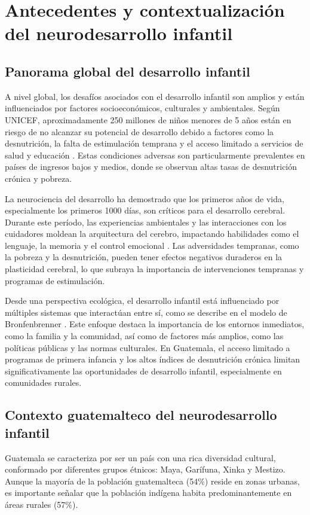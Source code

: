 \documentclass[11pt,letterpaper]{report}
\begin{document}
\section{Antecedentes y contextualización del neurodesarrollo infantil}
\subsection{Panorama global del desarrollo infantil}
A nivel global,  los desafíos asociados con el desarrollo infantil son amplios
y están influenciados por factores socioeconómicos, culturales y ambientales.
Según UNICEF, aproximadamente 250 millones de niños menores de 5 años están en 
riesgo de no alcanzar su potencial de desarrollo debido a factores como la 
desnutrición, la falta de estimulación temprana y el acceso limitado a 
servicios de salud y educación \cite{UNICEF2023}. Estas condiciones adversas 
son particularmente prevalentes en países de ingresos bajos y medios, donde se 
observan altas tasas de desnutrición crónica y pobreza.

La neurociencia del desarrollo ha demostrado que los primeros años de vida, 
especialmente los primeros 1000 días, son críticos para el desarrollo cerebral. 
Durante este período, las experiencias ambientales y las interacciones con los 
cuidadores moldean la arquitectura del cerebro, impactando habilidades como el 
lenguaje, la memoria y el control emocional \cite{Stiles2010}. Las adversidades 
tempranas, como la pobreza y la desnutrición, pueden tener efectos negativos 
duraderos en la plasticidad cerebral, lo que subraya la importancia de 
intervenciones tempranas y programas de estimulación.

Desde una perspectiva ecológica, el desarrollo infantil está influenciado por 
múltiples sistemas que interactúan entre sí, como se describe en el modelo de 
Bronfenbrenner \cite{Bronfenbrenner2005}. Este enfoque destaca la importancia 
de los entornos inmediatos, como la familia y la comunidad, así como de 
factores más amplios, como las políticas públicas y las normas culturales. En
Guatemala, el acceso limitado a programas de primera infancia y los altos
índices de desnutrición crónica limitan significativamente las oportunidades de
desarrollo infantil, especialmente en comunidades rurales. \cite{SESAN2022}

\subsection{Contexto guatemalteco del neurodesarrollo infantil}
Guatemala se caracteriza por ser un país con una rica diversidad cultural,
conformado por diferentes grupos étnicos: Maya, Garífuna, Xinka y Mestizo. 
Aunque la mayoría de la población guatemalteca (54\%) reside en zonas urbanas,
es importante señalar que la población indígena habita predominantemente en
áreas rurales (57\%). \cite{PoliticaInfanciaGuate}
\end{document}
